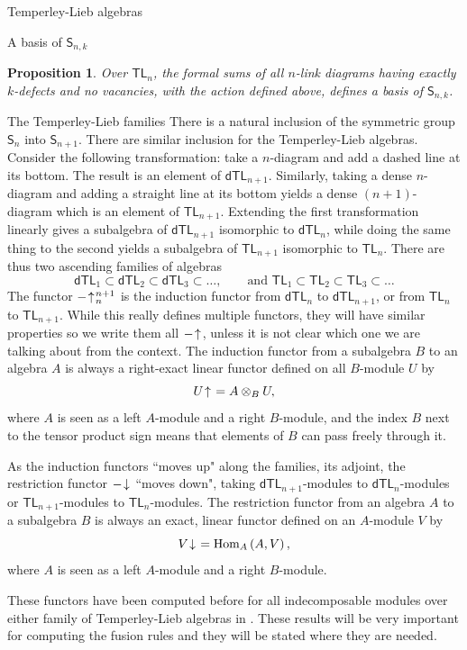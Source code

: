 \documentclass[reqno]{amsart}
\newtheorem{Prop}[Thm]{Proposition}
\newcommand{\dtl}[1]{\mathsf{dTL}_{#1}}
\newcommand{\tl}[1]{\mathsf{TL}_{#1}}
\newcommand{\ds}[1]{\mathsf S_{#1}}
\newcommand{\Res}[1]{#1{}\hspace{-0.18em} \downarrow{}\hskip -0.18em}
\newcommand{\Ind}[1]{#1{}\hspace{-0.18em} \uparrow{}\hskip -0.18em}
\begin{document}
\begin{section}{Temperley-Lieb algebras}
\begin{subsection}{A basis of $\ds{n,k}$}
\begin{Prop}
Over $\tl{n}$, the formal sums of all $n$-link diagrams having exactly $k$-defects and no vacancies, with the action defined above, defines a basis of $\ds{n,k}$.
\end{Prop}
\end{subsection}
\begin{subsection}{The Temperley-Lieb families}\label{sec:rappel.induction}
%
There is a natural inclusion of the symmetric group $\mathsf{S}_{n}$ into $\mathsf{S}_{n+1}$. There are similar inclusion for the Temperley-Lieb algebras. Consider the following transformation: take a $n$-diagram and add a dashed line at its bottom. The result is an element of $\dtl{n+1}$. Similarly, taking a dense $n$-diagram and adding a straight line at its bottom yields a dense $(n+1)$-diagram which is an element of $\tl{n+1}$. Extending the first transformation linearly gives a subalgebra of $\dtl{n+1}$ isomorphic to $\dtl{n}$, while doing the same thing to the second yields a subalgebra of $\tl{n+1}$ isomorphic to $\tl{n}$. There are thus two ascending families of algebras
\begin{equation*}
\dtl{1} \subset \dtl{2} \subset \dtl{3} \subset \hdots, \qquad \text{and }\tl{1} \subset \tl{2} \subset \tl{3} \subset \hdots
\end{equation*}
The functor $\Ind{-}^{n+1}_{n}$ is the induction functor from $\dtl{n}$ to $\dtl{n+1}$, or from $\tl{n}$ to $\tl{n+1}$. While this really defines multiple functors, they will have similar properties so we  write them all $\Ind{-}$, unless it is not clear which one we are talking about from the context. The induction functor from a subalgebra $B$ to an algebra $A$ is always a right-exact linear functor defined on all $B$-module $U$ by 
\begin{equation*}
\Ind{U} =  A \otimes_{B} U,
\end{equation*}
where $A$ is seen as a left $A$-module and a right $B$-module, and the index $B$ next to the tensor product sign means that elements of $B$ can pass freely through it.

As the induction functors ``moves up" along the families, its adjoint, the restriction functor $\Res{-}$ ``moves down", taking $\dtl{n+1}$-modules to $\dtl{n}$-modules or $\tl{n+1}$-modules to $\tl{n}$-modules. The restriction functor from an algebra $A$ to a subalgebra $B$ is always an exact, linear functor defined on an $A$-module $V$ by 
\begin{equation*}
\Res{V} = \text{Hom}_{A} \left( A , V \right),
\end{equation*}
where $A$ is seen as a left $A$-module and a right $B$-module.

These functors have been computed before for all indecomposable modules over either family of Temperley-Lieb algebras in \cite{RiSY,BelSY,BelRiSy}. These results will be very important for computing the fusion rules and they will be stated where they are needed.
%
\end{subsection}
%

\end{section}
\end{document}
